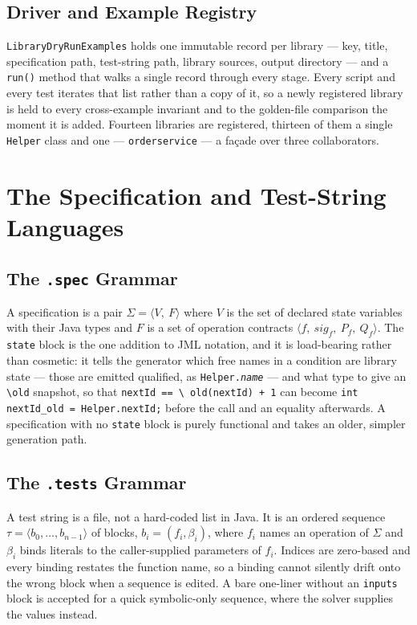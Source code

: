\documentclass[conference]{IEEEtran}
\begin{document}
\subsection{Driver and Example Registry}

\texttt{LibraryDryRunExamples} holds one immutable record per library --- key, title,
specification path, test-string path, library sources, output directory --- and a
\texttt{run()} method that walks a single record through every stage. Every script
and every test iterates that list rather than a copy of it, so a newly registered
library is held to every cross-example invariant and to the golden-file comparison
the moment it is added. Fourteen libraries are registered, thirteen of them a single
\texttt{Helper} class and one --- \texttt{orderservice} --- a fa\c{c}ade over three
collaborators.

\section{The Specification and Test-String Languages}
\label{sec:lang}

\subsection{The \texttt{.spec} Grammar}

A specification is a pair $\Sigma=\langle V,\ F\rangle$ where $V$ is the set of
declared state variables with their Java types and $F$ is a set of operation
contracts $\langle f,\ \mathit{sig}_f,\ P_f,\ Q_f\rangle$. The \texttt{state} block
is the one addition to JML notation, and it is load-bearing rather than cosmetic:
it tells the generator which free names in a condition are library state --- those are
emitted qualified, as \texttt{Helper.\textit{name}} --- and what type to give an
\texttt{\textbackslash old} snapshot, so that \texttt{nextId == \textbackslash
old(nextId) + 1} can become \texttt{int nextId\_old = Helper.nextId;} before the
call and an equality afterwards. A specification with no \texttt{state} block is
purely functional and takes an older, simpler generation path.

\subsection{The \texttt{.tests} Grammar}

A test string is a file, not a hard-coded list in Java. It is an ordered sequence
$\tau=\langle b_0,\dots,b_{n-1}\rangle$ of blocks, $b_i=(f_i,\beta_i)$, where $f_i$
names an operation of $\Sigma$ and $\beta_i$ binds literals to the caller-supplied
parameters of $f_i$. Indices are zero-based and every binding restates the function
name, so a binding cannot silently drift onto the wrong block when a sequence is
edited. A bare one-liner without an \texttt{inputs} block is accepted for a quick
symbolic-only sequence, where the solver supplies the values instead.
\end{document}
